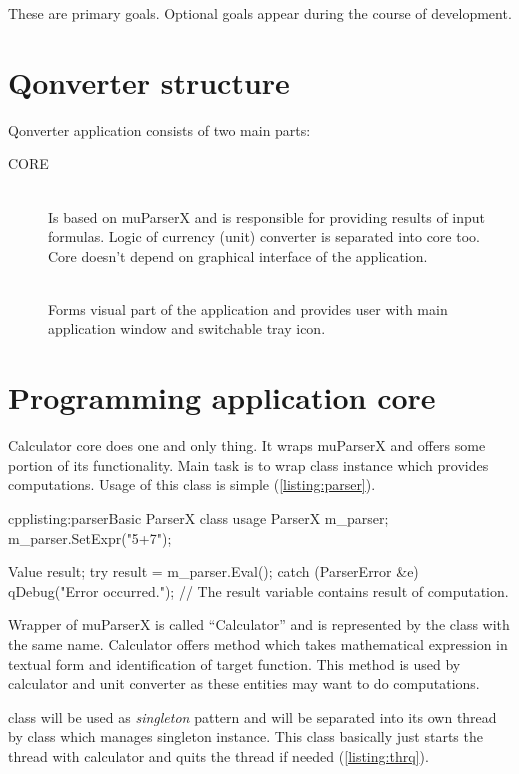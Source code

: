 These are primary goals. Optional goals appear during the course of development.

\section{Qonverter structure}
Qonverter application consists of two main parts:
\begin{description}
\item[CORE] \hfill \\
Is based on muParserX and is responsible for providing results of input formulas. Logic of currency (unit) converter is separated into core too. Core doesn't depend on graphical interface of the application.
\item[] \hfill \\
Forms visual part of the application and provides user with main application window and switchable tray icon.
\end{description}

\section{Programming application core}
Calculator core does one and only thing. It wraps muParserX and offers some portion of its functionality. Main task is to wrap class instance which provides computations. Usage of this class is simple (\autoref{listing:parser}).

\begin{fdoccode}{cpp}{listing:parser}{Basic ParserX class usage}
ParserX m_parser;
m_parser.SetExpr("5+7");

Value result;
try {
	result = m_parser.Eval();
}
catch (ParserError &e) {
	qDebug("Error occurred.");
}
// The result variable contains result of computation.
\end{fdoccode}

Wrapper of muParserX is called \enquote{Calculator} and is represented by the class with the same name. Calculator offers method which takes mathematical expression in textual form and identification of target function. This method is used by calculator and unit converter as these entities may want to do computations.

\indent {} class will be used as \textit{singleton} pattern and will be separated into its own thread by class which manages singleton instance. This class basically just starts the thread with calculator and quits the thread if needed (\autoref{listing:thrq}).

